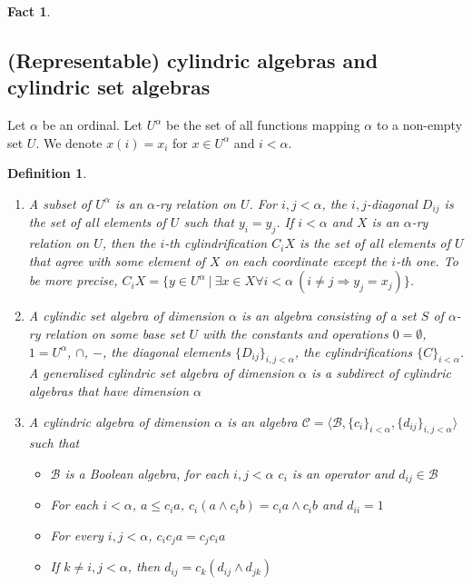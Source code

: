 \documentclass[a4paper]{article}
\theoremstyle{defin}
\newtheorem{defin}{Definition}
\theoremstyle{theorem}
\theoremstyle{prop}
\theoremstyle{lemma}
\theoremstyle{fact}
\newtheorem{fact}{Fact}
\theoremstyle{ex}
\theoremstyle{col}
\begin{document}
\begin{fact}
\end{fact}

\subsection{(Representable) cylindric algebras and cylindric set algebras}

Let $\alpha$ be an ordinal. Let $U^{\alpha}$ be the set of all functions mapping $\alpha$ to a non-empty set $U$. We denote $x(i) = x_i$ for
$x \in U^{\alpha}$ and $i < \alpha$.

\begin{defin}
$ $

  \begin{enumerate}
    \item A subset of $U^{\alpha}$ is an $\alpha$-ry relation on $U$. For $i, j < \alpha$, the $i,j$-diagonal $D_{ij}$ is the set of all
    elements of $U$ such that $y_i = y_j$. If $i < \alpha$ and $X$ is an $\alpha$-ry relation on $U$, then
    the $i$-th cylindrification $C_i X$ is the set of all elements of $U$ that agree with some element of $X$ on each coordinate except the
    $i$-th one. To be more precise,
    $C_i X = \{ y \in U^{\alpha} \: | \: \exists x \in X \forall i < \alpha \: (i \neq j \Rightarrow y_j = x_j)\}$.
    \item A cylindic set algebra of dimension $\alpha$ is an algebra consisting of a set $S$ of $\alpha$-ry relation on some base set $U$
    with the constants and operations $0 = \emptyset$, $1 = U^{\alpha}$, $\cap$, $-$, the diagonal elements $\{ D_{ij} \}_{i, j < \alpha}$,
    the cylindrifications $\{ C \}_{i < \alpha}$. A generalised cylindric set algebra of dimension $\alpha$ is a subdirect of
    cylindric algebras that have dimension $\alpha$
    \item A cylindric algebra of dimension $\alpha$ is an algebra $\mathcal{C} = \langle \mathcal{B}, \{ c_i \}_{i < \alpha}, \{ d_{ij} \}_{i, j < \alpha} \rangle$ such that
    \begin{itemize}
      \item $\mathcal{B}$ is a Boolean algebra, for each $i, j < \alpha$ $c_i$ is an operator and $d_{ij} \in \mathcal{B}$
      \item For each $i < \alpha$, $a \leq c_i a$, $c_i (a \land c_i b) = c_i a \land c_i b$ and $d_{ii} = 1$
      \item For every $i, j < \alpha$, $c_i c_j a = c_j c_i a$
      \item If $k \neq i, j < \alpha$, then $d_{ij} = c_k (d_{ij} \land d_{jk})$

\end{itemize}
\end{enumerate}
\end{defin}
\end{document}
